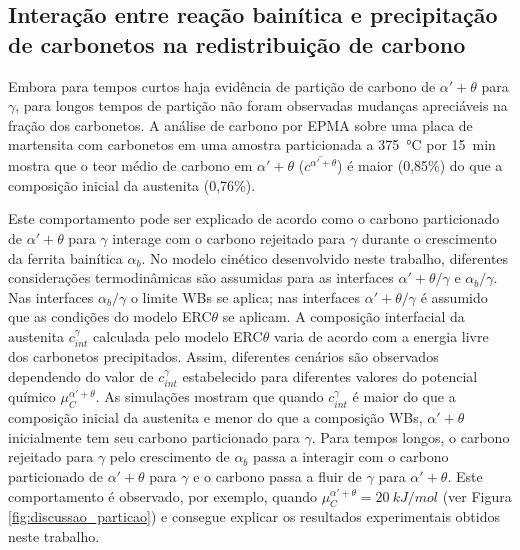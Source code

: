 \subsection{Interação entre reação bainítica e precipitação de carbonetos na redistribuição de carbono}

Embora para tempos curtos haja evidência de partição de carbono de $\alpha' + \theta$ para $\gamma$, para longos tempos de partição não foram observadas mudanças apreciáveis na fração dos carbonetos. A análise de carbono por EPMA sobre uma placa de martensita com carbonetos em uma amostra particionada a \SI{375}{\degreeCelsius} por 15~min mostra que o teor médio de carbono em $\alpha' + \theta$ ($\overline{c^{\alpha' + \theta}}$) é maior (0,85\%) do que a composição inicial da austenita (0,76\%).

Este comportamento pode ser explicado de acordo como o carbono particionado de $\alpha' + \theta$ para $\gamma$ interage com o carbono rejeitado para $\gamma$ durante o crescimento da ferrita bainítica $\alpha_b$. No modelo cinético desenvolvido neste trabalho, diferentes considerações termodinâmicas são assumidas para as interfaces $\alpha' + \theta/\gamma$ e $\alpha_b/\gamma$. Nas interfaces $\alpha_b/\gamma$ o limite WBs se aplica; nas interfaces $\alpha' + \theta/\gamma$ é assumido que as condições do modelo ERC$\theta$ se aplicam. A composição interfacial da austenita $c^\gamma_{int}$ calculada pelo modelo ERC$\theta$ varia de acordo com a energia livre dos carbonetos precipitados. Assim, diferentes cenários são observados dependendo do valor de $c^\gamma_{int}$ estabelecido para diferentes valores do potencial químico $\mu_C^{\alpha' + \theta}$. As simulações mostram que quando $c^\gamma_{int}$ é maior do que a composição inicial da austenita e menor do que a composição WBs, $\alpha' + \theta$ inicialmente tem seu carbono particionado para $\gamma$. Para tempos longos, o carbono rejeitado para $\gamma$ pelo crescimento de $\alpha_b$ passa a interagir com o carbono particionado de $\alpha' + \theta$ para $\gamma$ e o carbono passa a fluir de $\gamma$ para $\alpha' + \theta$. Este comportamento é observado, por exemplo, quando $\mu_C^{\alpha' + \theta} = \SI{20}{kJ/mol}$ (ver Figura \ref{fig:discussao_particao}) e consegue explicar os resultados experimentais obtidos neste trabalho.

